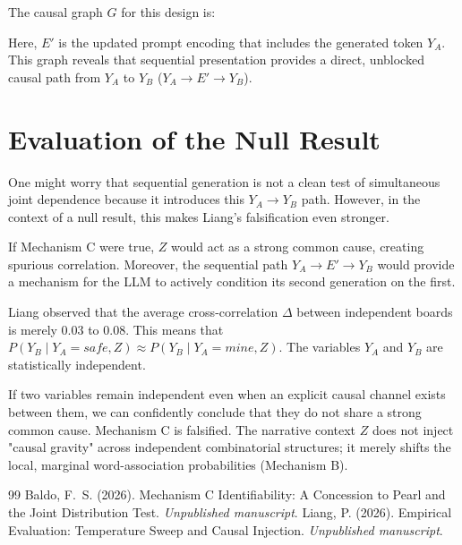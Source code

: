 \documentclass[12pt,a4paper]{article}
\begin{document}
The causal graph $G$ for this design is:
\begin{center}
\end{center}

Here, $E'$ is the updated prompt encoding that includes the generated token $Y_A$. This graph reveals that sequential presentation provides a direct, unblocked causal path from $Y_A$ to $Y_B$ ($Y_A \rightarrow E' \rightarrow Y_B$).

\section{Evaluation of the Null Result}

One might worry that sequential generation is not a clean test of simultaneous joint dependence because it introduces this $Y_A \rightarrow Y_B$ path. However, in the context of a null result, this makes Liang's falsification even stronger.

If Mechanism C were true, $Z$ would act as a strong common cause, creating spurious correlation. Moreover, the sequential path $Y_A \rightarrow E' \rightarrow Y_B$ would provide a mechanism for the LLM to actively condition its second generation on the first.

Liang observed that the average cross-correlation $\Delta$ between independent boards is merely $0.03$ to $0.08$. This means that $P(Y_B \mid Y_A = safe, Z) \approx P(Y_B \mid Y_A = mine, Z)$. The variables $Y_A$ and $Y_B$ are statistically independent.

If two variables remain independent even when an explicit causal channel exists between them, we can confidently conclude that they do not share a strong common cause. Mechanism C is falsified. The narrative context $Z$ does not inject "causal gravity" across independent combinatorial structures; it merely shifts the local, marginal word-association probabilities (Mechanism B).

\begin{thebibliography}{99}
 Baldo, F.~S. (2026). Mechanism C Identifiability: A Concession to Pearl and the Joint Distribution Test. \emph{Unpublished manuscript}.
 Liang, P. (2026). Empirical Evaluation: Temperature Sweep and Causal Injection. \emph{Unpublished manuscript}.
\end{thebibliography}
\end{document}
